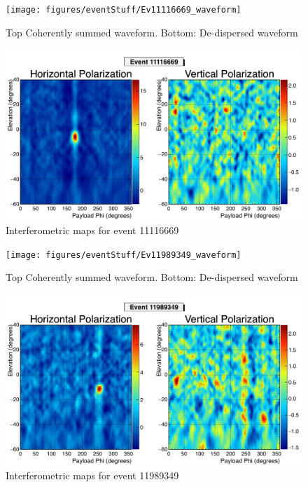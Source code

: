 	
	
		\begin{figure}
		\centering
			\texttt{[image: figures/eventStuff/Ev11116669\_waveform]}
			\caption{Top Coherently summed waveform.  Bottom: De-dispersed waveform} 
		\label{fig:Ev11116669_waveform}
		\end{figure}
			
		\begin{figure}
		\centering
			\includegraphics[width=\textwidth]{figures/intMap/intMap_ev11116669}
			\caption{Interferometric maps for event 11116669} 
		\label{fig:Ev11116669_map}
		\end{figure}			


		\begin{figure}
		\centering
			\texttt{[image: figures/eventStuff/Ev11989349\_waveform]}
			\caption{Top Coherently summed waveform.  Bottom: De-dispersed waveform} 
		\label{fig:Ev11989349_waveform}
		\end{figure}
			
		\begin{figure}
		\centering
			\includegraphics[width=\textwidth]{figures/intMap/intMap_ev11989349}
			\caption{Interferometric maps for event 11989349} 
		\label{fig:Ev11989349_map}
		\end{figure}		
	
